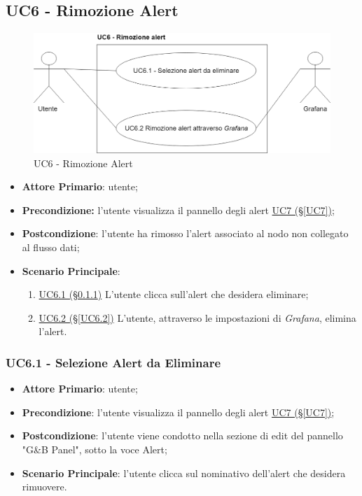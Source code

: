 \newpage

\subsection{UC6 - Rimozione Alert}\label{UC6}

\begin{figure}[H]
	\centering
	\includegraphics[scale=0.4]{./images/UC6.png}
	\caption{UC6 - Rimozione Alert}
\end{figure}

\begin{itemize}
	\item \textbf{Attore Primario}: utente;
	\item \textbf{Precondizione:} l'utente visualizza il pannello degli alert \hyperref[UC7]{UC7 (§\ref*{UC7})};
	\item \textbf{Postcondizione}: l'utente ha rimosso l'alert associato al nodo non collegato al flusso dati;
	\item \textbf{Scenario Principale}: 
	\begin{enumerate}
		\item \hyperref[UC6.1]{UC6.1 (§\ref*{UC6.1})} L'utente clicca sull'alert che desidera eliminare;
		\item \hyperref[UC6.2]{UC6.2 (§\ref*{UC6.2})} L'utente, attraverso le impostazioni di \textit{Grafana}, elimina l'alert.
	\end{enumerate}
\end{itemize}

\subsubsection{UC6.1 - Selezione Alert da Eliminare}\label{UC6.1}
\begin{itemize}
	\item \textbf{Attore Primario}: utente;
	\item \textbf{Precondizione}:  l'utente visualizza il pannello degli alert \hyperref[UC7]{UC7 (§\ref*{UC7})};
	\item \textbf{Postcondizione}: l'utente viene condotto nella sezione di edit del pannello "G\&B Panel", sotto la voce Alert;
	\item \textbf{Scenario Principale}: l'utente clicca sul nominativo dell'alert che desidera rimuovere.
\end{itemize}

